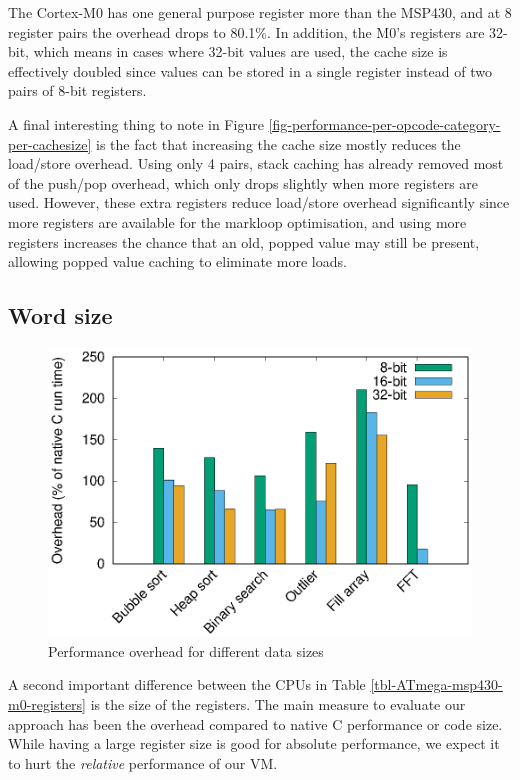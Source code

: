 The Cortex-M0 has one general purpose register more than the MSP430, and at 8 register pairs the overhead drops to 80.1\%. In addition, the M0's registers are 32-bit, which means in cases where 32-bit values are used, the cache size is effectively doubled since values can be stored in a single register instead of two pairs of 8-bit registers.

A final interesting thing to note in Figure \ref{fig-performance-per-opcode-category-per-cachesize} is the fact that increasing the cache size mostly reduces the load/store overhead. Using only 4 pairs, stack caching has already removed most of the push/pop overhead, which only drops slightly when more registers are used. However, these extra registers reduce load/store overhead significantly since more registers are available for the markloop optimisation, and using more registers increases the chance that an old, popped value may still be present, allowing popped value caching to eliminate more loads.

\subsection{Word size}
\label{sec-evaluation-other-platforms-word-size}

\begin{figure}
\centering
\includegraphics[width=\mygraphsize]{8_16_32_bit.eps}
\caption{Performance overhead for different data sizes}
\label{fig-performance-8-16-32-bit}
\end{figure}



A second important difference between the CPUs in Table \ref{tbl-ATmega-msp430-m0-registers} is the size of the registers. The main measure to evaluate our approach has been the overhead compared to native C performance or code size. While having a large register size is good for absolute performance, we expect it to hurt the \emph{relative} performance of our VM.

